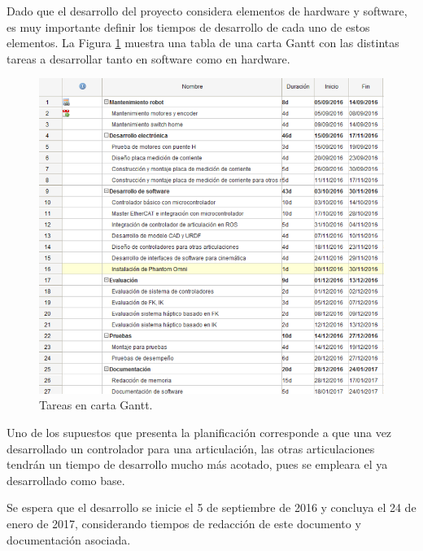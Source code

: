 Dado que el desarrollo del proyecto considera elementos de hardware y software, es muy importante definir los tiempos de desarrollo de cada uno de estos elementos. La Figura \ref{cap1_tabla_gantt} muestra una tabla de una carta Gantt con las distintas tareas a desarrollar tanto en software como en hardware.

\begin{figure}[ht]
  \centering
  \includegraphics[scale=0.5]{img/cap1/tareas_gantt}
  \caption{Tareas en carta Gantt.}
  \label{cap1_tabla_gantt}
\end{figure}

Uno de los supuestos que presenta la planificación corresponde a que una vez desarrollado un controlador para una articulación, las otras articulaciones tendrán un tiempo de desarrollo mucho más acotado, pues se empleara el ya desarrollado como base.

Se espera que el desarrollo se inicie el 5 de septiembre de 2016 y concluya el 24 de enero de 2017, considerando tiempos de redacción de este documento y documentación asociada.









